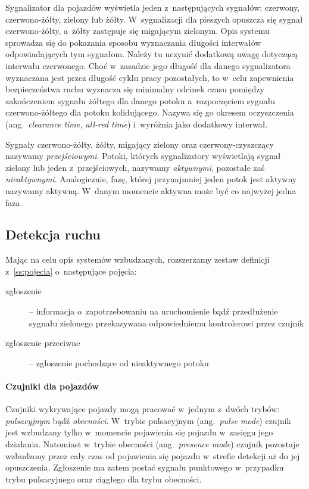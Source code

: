 \documentclass{pracamgr}
\newcommand{\ang}[1]{(ang.~\emph{#1})}
\theoremstyle{plain}
\begin{document}
Sygnalizator dla pojazdów wyświetla jeden z~następujących sygnałów:
czerwony, czerwono-żółty, zielony lub żółty. W~sygnalizacji dla
pieszych opuszcza się sygnał czerwono-żółty, a~żółty zastępuje się
migającym zielonym. Opis systemu sprowadza się do pokazania sposobu
wyznaczania długości interwałów odpowiadających tym sygnałom. Należy
tu uczynić dodatkową uwagę dotyczącą interwału czerwonego. Choć
w~zasadzie jego długość dla danego sygnalizatora wyznaczana jest przez
długość cyklu pracy pozostałych, to w~celu zapewnienia bezpieczeństwa
ruchu wyznacza się minimalny odcinek czasu pomiędzy zakończeniem
sygnału żółtego dla danego potoku a~rozpoczęciem sygnału
czerwono-żółtego dla potoku kolidującego. Nazywa się go okresem
oczyszczenia \ang{clearance time, all-red time} i~wyróżnia jako
dodatkowy interwał.

Sygnały czerwono-żółty, żółty, migający zielony oraz
czerwony-czyszczący nazywamy \emph{przejściowymi}. Potoki, których
sygnalizatory wyświetlają sygnał zielony lub jeden z~przejściowych,
nazywamy \emph{aktywnymi}, pozostałe zaś
\emph{nieaktywnymi}. Analogicznie, fazę, której przynajmniej jeden
potok jest aktywny nazywamy aktywną. W~danym momencie aktywna może być
co najwyżej jedna faza.

\subsection{Detekcja ruchu}
\label{ss:detekcja} Mając na celu opis systemów wzbudzanych,
rozszerzamy zestaw definicji z~\ref{ss:pojecia} o~następujące
pojęcia:
\begin{description}
  \item[zgłoszenie] -- informacja o~zapotrzebowaniu na uruchomienie
bądź przedłużenie sygnału zielonego przekazywana odpowiedniemu
kontrolerowi przez czujnik
  \item[zgłoszenie przeciwne] -- zgłoszenie pochodzące od nieaktywnego
potoku
\end{description}

\paragraph{Czujniki dla pojazdów} Czujniki wykrywające pojazdy mogą
pracować w~jednym z~dwóch trybów: \emph{pulsacyjnym} bądź
\emph{obecności}.  W~trybie pulsacyjnym \ang{pulse mode} czujnik jest
wzbudzany tylko w~momencie pojawienia się pojazdu w~zasięgu jego
działania.  Natomiast w~trybie obecności \ang{presence mode} czujnik
pozostaje wzbudzony przez cały czas od pojawienia się pojazdu
w~strefie detekcji aż do jej opuszczenia. Zgłoszenie ma zatem postać
sygnału punktowego w~przypadku trybu pulsacyjnego oraz ciągłego dla
trybu obecności.
\end{document}

